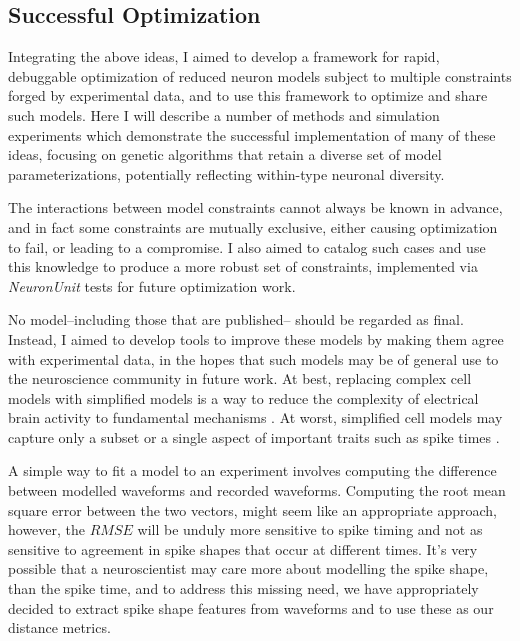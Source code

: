 \subsection{Successful Optimization} 
Integrating the above ideas, I aimed to develop a framework for rapid, debuggable optimization of reduced neuron models subject to multiple constraints forged by experimental data, and to use this framework to optimize and share such models.
Here I will describe a number of methods and simulation experiments which demonstrate the successful implementation of many of these ideas, focusing on genetic algorithms that retain a diverse set of model parameterizations, potentially reflecting  within-type neuronal diversity.

The interactions between model constraints cannot always be known in advance, and in fact some constraints are mutually exclusive, either causing optimization to fail, or leading to a compromise. I also aimed to catalog such cases and use this knowledge to produce a more robust set of constraints, implemented via \emph{NeuronUnit} tests for future optimization work.

No model--including those that are published-- should be regarded as final.
Instead, I aimed to develop tools to improve these models by making them agree with experimental data, in the hopes that such models may be of general use to the neuroscience community in future work.
At best, replacing complex cell models with simplified models is a way to reduce the complexity of electrical brain activity to fundamental mechanisms \cite{teeter2018generalized}. At worst, simplified cell models may capture only a subset or a single aspect of important traits such as spike times \cite{hertag2012approximation}. %

A simple way to fit a model to an experiment involves computing the difference between modelled waveforms and recorded waveforms. Computing the root mean square error between the two vectors, might seem like an appropriate approach, however, the $RMSE$  will be unduly more sensitive to spike timing and not as sensitive to agreement in spike shapes that occur at different times. It's very possible that a neuroscientist may care more about modelling the spike shape, than the spike time, and to address this missing need, we have appropriately decided to extract spike shape features from waveforms and to use these as our distance metrics.

